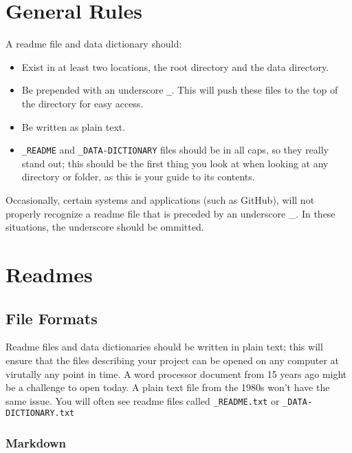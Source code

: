 \documentclass[
]{book}
\providecommand{\tightlist}{%
  \setlength{\itemsep}{0pt}\setlength{\parskip}{0pt}}
\begin{document}
\hypertarget{general-rules-3}{%
\section*{General Rules}\label{general-rules-3}}

A readme file and data dictionary should:

\begin{itemize}
\tightlist
\item
  Exist in at least two locations, the root directory and the data directory.
\item
  Be prepended with an underscore \texttt{\_}. This will push these files to the top of the directory for easy access.
\item
  Be written as plain text.
\item
  \texttt{\_README} and \texttt{\_DATA-DICTIONARY} files should be in all caps, so they really stand out; this should be the first thing you look at when looking at any directory or folder, as this is your guide to its contents.
\end{itemize}

Occasionally, certain systems and applications (such as GitHub), will not properly recognize a readme file that is preceded by an underscore \_. In these situations, the underscore should be ommitted.

\hypertarget{readmes}{%
\section*{Readmes}\label{readmes}}

\hypertarget{file-formats-2}{%
\subsection*{File Formats}\label{file-formats-2}}

Readme files and data dictionaries should be written in plain text; this will ensure that the files describing your project can be opened on any computer at virutally any point in time. A word processor document from 15 years ago might be a challenge to open today. A plain text file from the 1980s won't have the same issue. You will often see readme files called \texttt{\_README.txt} or \texttt{\_DATA-DICTIONARY.txt}

\hypertarget{markdown}{%
\subsubsection*{Markdown}\label{markdown}}
\end{document}
